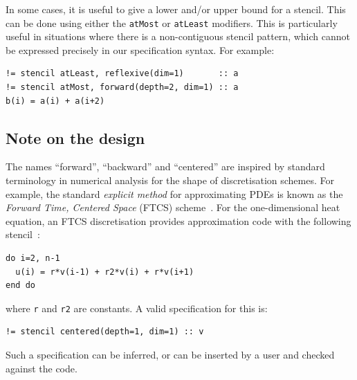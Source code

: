 \documentclass[9pt]{sigplanconf}
\theoremstyle{definition}
\newcommand{\eg}{\emph{e.g.}}
\newcommand{\term}[1]{\texttt{#1}}
\begin{document}
%
%


In some cases, it is useful to give a lower and/or upper bound for a
stencil. This can be done using either the \term{atMost} or
\term{atLeast} modifiers. This is particularly useful in situations
where there is a non-contiguous stencil pattern, which cannot be expressed
precisely in our specification syntax. For example:
\begin{verbatim}
!= stencil atLeast, reflexive(dim=1)       :: a
!= stencil atMost, forward(depth=2, dim=1) :: a
b(i) = a(i) + a(i+2)
\end{verbatim}


\subsection{Note on the design}

The names ``forward'', ``backward'' and ``centered''
are inspired by standard terminology in numerical analysis
for the shape of discretisation schemes. For example,
the standard \emph{explicit method} for approximating
PDEs is known as the \emph{Forward Time, Centered Space} (FTCS)
scheme~\cite{dawson1991finite}. For
the one-dimensional heat equation, an FTCS discretisation
provides approximation code with the following stencil~\cite{recktenwald2004finite}:
\begin{verbatim}
do i=2, n-1
  u(i) = r*v(i-1) + r2*v(i) + r*v(i+1)
end do
\end{verbatim}
where \texttt{r} and \texttt{r2} are constants.
A valid specification for this is:
\begin{verbatim}
!= stencil centered(depth=1, dim=1) :: v
\end{verbatim}
Such a specification can be inferred, or can be inserted by a user
and checked against the code.
\end{document}
